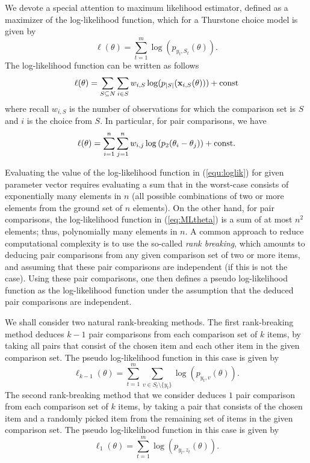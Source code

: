 We devote a special attention to maximum likelihood estimator, defined as a maximizer of the log-likelihood function, which for a Thurstone choice model is given by  
\begin{equation}
\ell(\theta) = \sum_{t=1}^m \log(p_{y_t,S_t}(\theta)).
\label{equ:loglik0}
\end{equation}
The log-likelihood function can be written as follows
\begin{equation}
\ell(\theta) = \sum_{S\subseteq N}\sum_{i\in S} w_{i,S}\log(p_{|S|}(\vec{x}_{i,S}(\theta))) + \hbox{const}
\label{equ:loglik}
\end{equation}
where recall $w_{i,S}$ is the number of observations for which the comparison set is $S$ and $i$ is the choice from $S$. In particular, for pair comparisons, we have
\begin{equation}
\ell(\theta) = \sum_{i=1}^n\sum_{j=1}^n w_{i,j} \log \left( p_2(\theta_i - \theta_j) \right)  + \hbox{const}.
\label{eq:MLtheta}
\end{equation}  

Evaluating the value of the log-likelihood function in (\ref{equ:loglik}) for given parameter vector requires evaluating a sum that in the worst-case consists of exponentially many elements in $n$ (all possible combinations of two or more elements from the ground set of $n$ elements). On the other hand, for pair comparisons, the log-likelihood function in (\ref{eq:MLtheta}) is a sum of at most $n^2$ elements; thus, polynomially many elements in $n$. A common approach to reduce computational complexity is to use the so-called \emph{rank breaking}, which amounts to deducing pair comparisons from any given comparison set of two or more items, and assuming that these pair comparisons are independent (if this is not the case). Using these pair comparisons, one then defines a pseudo log-likelihood function as the log-likelihood function under the assumption that the deduced pair comparisons are independent.   

We shall consider two natural rank-breaking methods. The first rank-breaking method deduces $k-1$ pair comparisons from each comparison set of $k$ items, by taking all pairs that consist of the chosen item and each other item in the given comparison set. The pseudo log-likelihood function in this case is given by
\begin{equation}
\ell_{k-1}(\theta) = \sum_{t=1}^m \sum_{v\in S_t\setminus \{y_t\}} \log(p_{y_t,v}(\theta)).
\label{equ:pseudolikk}
\end{equation}
The second rank-breaking method that we consider deduces $1$ pair comparison from each comparison set of $k$ items, by taking a pair that consists of the chosen item and a randomly picked item from the remaining set of items in the given comparison set. The pseudo log-likelihood function in this case is given by
\begin{equation}
\ell_1(\theta) = \sum_{t=1}^m \log(p_{y_t,z_t}(\theta)).
\label{equ:pseudolik1}
\end{equation}

